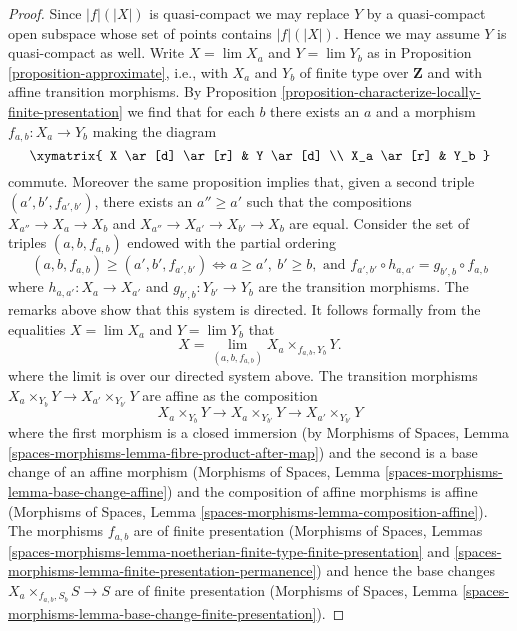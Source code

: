 \begin{proof}
Since $|f|(|X|)$ is quasi-compact we may replace $Y$ by a quasi-compact
open subspace whose set of points contains $|f|(|X|)$. Hence we may assume
$Y$ is quasi-compact as well. Write $X = \lim X_a$ and $Y = \lim Y_b$ as in
Proposition \ref{proposition-approximate}, i.e., with $X_a$ and $Y_b$
of finite type over $\mathbf{Z}$ and with affine transition morphisms.
By Proposition \ref{proposition-characterize-locally-finite-presentation}
we find that for each $b$ there exists an $a$ and a morphism
$f_{a, b} : X_a \to Y_b$ making the diagram
$$
\xymatrix{
X \ar[d] \ar[r] & Y \ar[d] \\
X_a \ar[r] & Y_b
}
$$
commute. Moreover the same proposition implies that, given a second
triple $(a', b', f_{a', b'})$, there exists an $a'' \geq a'$ such that
the compositions $X_{a''} \to X_a \to X_b$ and
$X_{a''} \to X_{a'} \to X_{b'} \to X_b$ are equal.
Consider the set of triples $(a, b, f_{a, b})$ endowed with the
partial ordering
$$
(a, b, f_{a, b}) \geq (a', b', f_{a', b'})
\Leftrightarrow
a \geq a',\ b' \geq b,\text{ and }
f_{a', b'} \circ h_{a, a'} = g_{b', b} \circ f_{a, b}
$$
where $h_{a, a'} : X_a \to X_{a'}$ and $g_{b', b} : Y_{b'} \to Y_b$
are the transition morphisms. The remarks above show that this system
is directed. It follows formally from the equalities
$X = \lim X_a$ and $Y = \lim Y_b$ that
$$
X = \lim_{(a, b, f_{a, b})} X_a \times_{f_{a, b}, Y_b} Y.
$$
where the limit is over our directed system above. The transition morphisms
$X_a \times_{Y_b} Y \to X_{a'} \times_{Y_{b'}} Y$ are affine as
the composition
$$
X_a \times_{Y_b} Y \to X_a \times_{Y_{b'}} Y \to X_{a'} \times_{Y_{b'}} Y
$$
where the first morphism is a closed immersion (by
Morphisms of Spaces, Lemma
\ref{spaces-morphisms-lemma-fibre-product-after-map})
and the second is a base change of an affine morphism
(Morphisms of Spaces, Lemma \ref{spaces-morphisms-lemma-base-change-affine})
and the composition of affine morphisms is affine
(Morphisms of Spaces, Lemma \ref{spaces-morphisms-lemma-composition-affine}).
The morphisms $f_{a, b}$ are of finite presentation
(Morphisms of Spaces, Lemmas
\ref{spaces-morphisms-lemma-noetherian-finite-type-finite-presentation} and
\ref{spaces-morphisms-lemma-finite-presentation-permanence})
and hence the base changes $X_a \times_{f_{a, b}, S_b} S \to S$
are of finite presentation
(Morphisms of Spaces, Lemma
\ref{spaces-morphisms-lemma-base-change-finite-presentation}).
\end{proof}






